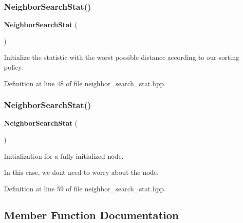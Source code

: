 \subsubsection{Neighbor\+Search\+Stat()\hspace{0.1cm}{\footnotesize\ttfamily [1/2]}}
{\footnotesize\ttfamily \textbf{ Neighbor\+Search\+Stat} (\begin{DoxyParamCaption}{ }\end{DoxyParamCaption})\hspace{0.3cm}{\ttfamily [inline]}}



Initialize the statistic with the worst possible distance according to our sorting policy. 



Definition at line 48 of file neighbor\+\_\+search\+\_\+stat.\+hpp.

\mbox{\label{classmlpack_1_1neighbor_1_1NeighborSearchStat_a8d225f9b18a8723e0168142797bb8b65}} 
\subsubsection{Neighbor\+Search\+Stat()\hspace{0.1cm}{\footnotesize\ttfamily [2/2]}}
{\footnotesize\ttfamily \textbf{ Neighbor\+Search\+Stat} (\begin{DoxyParamCaption}\item[{Tree\+Type \&}]{ }\end{DoxyParamCaption})\hspace{0.3cm}{\ttfamily [inline]}}



Initialization for a fully initialized node. 

In this case, we don\textquotesingle{}t need to worry about the node. 

Definition at line 59 of file neighbor\+\_\+search\+\_\+stat.\+hpp.



\subsection{Member Function Documentation}
\mbox{\label{classmlpack_1_1neighbor_1_1NeighborSearchStat_a212cacc0ad25f0c3b409e19bd4062474}} 
